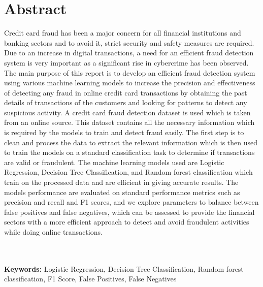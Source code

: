 \chapter*{\center \Large  Abstract}

 Credit card fraud has been a major concern for all financial institutions and 
 banking sectors and to avoid it, strict security and safety measures are 
 required. Due to an increase in digital transactions, a need for an efficient 
 fraud detection system is very important as a significant rise in cybercrime 
 has been observed. The main purpose of this report is to develop an efficient 
 fraud detection system using various machine learning models to increase the 
 precision and effectiveness of detecting any fraud in online credit card 
 transactions by obtaining the past details of transactions of the customers 
 and looking for patterns to detect any suspicious activity. A credit card 
 fraud detection dataset is used which is taken from an online source. This 
 dataset contains all the necessary information which is required by the 
 models to train and detect fraud easily. The first step is to clean and 
 process the data to extract the relevant information which is then used to 
 train the models on a standard classification task to determine if transactions are valid or fraudulent. The machine 
 learning models used are Logistic Regression, Decision Tree Classification, 
 and Random forest classification which train on the processed data and are 
 efficient in giving accurate results. The models performance are evaluated on standard performance metrics such as precision and recall and F1 scores, and we explore parameters to balance between false positives and false negatives,  which can be assessed to provide the financial sectors with a 
 more efficient approach to detect and avoid fraudulent activities while doing 
 online transactions.

~\\[1cm]%



~\\[1cm]
\noindent %
\textbf{Keywords:} Logistic Regression, Decision Tree Classification, Random forest classification, F1 Score, False Positives, False Negatives

\vfill
\noindent


